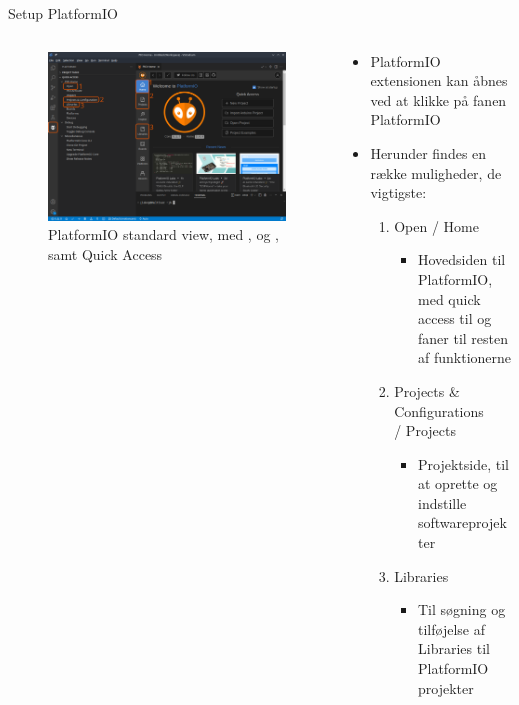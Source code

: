 \documentclass[aspectratio=169]{beamer}
\begin{document}
\begin{frame}{Setup PlatformIO}
\begin{columns}
	\begin{column}{0.5\textwidth}
		\begin{figure}
  			\includegraphics[width=\textwidth,keepaspectratio=true]{assets/pictures/pio-menu.png}
  			\caption{PlatformIO standard view, med ,  og , samt Quick Access}
  			\label{fig:pio-menu}
		\end{figure}
	\end{column}
	\begin{column}{0.5\textwidth}
		\begin{textBox}
			\begin{itemize}
				\item PlatformIO extensionen kan åbnes ved at klikke på fanen PlatformIO 
				\item Herunder findes en række muligheder, de vigtigste:
				\begin{enumerate}
					\item Open / Home
					\begin{itemize}
						\item Hovedsiden til PlatformIO, med quick access til og faner til resten af funktionerne
					\end{itemize}
					\item Projects \& Configurations \\/ Projects
					\begin{itemize}
						\item Projektside, til at oprette og indstille softwareprojekter
					\end{itemize}
					\item Libraries
					\begin{itemize}
						\item Til søgning og tilføjelse af Libraries til PlatformIO projekter
					\end{itemize}
				\end{enumerate}
			\end{itemize}
		\end{textBox}
	\end{column}
\end{columns}
\end{frame}
\end{document}
